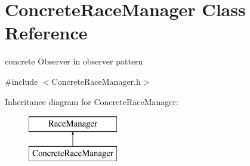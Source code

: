 \hypertarget{class_concrete_race_manager}{}\section{Concrete\+Race\+Manager Class Reference}
\label{class_concrete_race_manager}


concrete Observer in observer pattern  




{\ttfamily \#include $<$Concrete\+Race\+Manager.\+h$>$}

Inheritance diagram for Concrete\+Race\+Manager\+:\begin{figure}[H]
\begin{center}
\leavevmode
\includegraphics[height=2.000000cm]{class_concrete_race_manager}
\end{center}
\end{figure}
